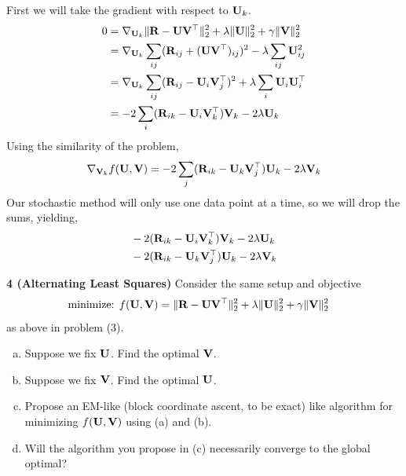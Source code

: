 \documentclass[12pt,letterpaper,fleqn]{hmcpset}
\begin{document}
\begin{solution}
    First we will take the gradient with respect to ${\bf U}_k$.
    \begin{align*}
        0 &= \nabla_{{\bf U}_k} \|{\bf R} - {\bf U}{\bf V}^\top\|_2^2 + \lambda\|{\bf U}\|_2^2 + \gamma\|{\bf V}\|_2^2\\
        &= \nabla_{{\bf U}_k} \sum_{ij}({\bf R}_{ij} + ({\bf U} {\bf V}^\top)_{ij} )^2 - \lambda \sum_{ij} {\bf U}_{ij}^2 \\
        &= \nabla_{{\bf U}_k} \sum_{ij}({\bf R}_{ij} - {\bf U}_i {\bf V}^\top_j )^2 + \lambda \sum_{i} {\bf U}_i {\bf U}_i^\top \\
        &=  -2 \sum_{i}({\bf R}_{ik} - {\bf U}_i {\bf V}^\top_k) {\bf V}_k - 2\lambda {\bf U}_{k}
    \end{align*}
    Using the similarity of the problem, 
    $$
        \nabla_{{\bf V}_k} f({\bf U},{\bf V}) = -2 \sum_{j}({\bf R}_{ik} - {\bf U}_k {\bf V}^\top_j) {\bf U}_k - 2\lambda {\bf V}_{k}
    $$
    Our stochastic method will only use one data point at a time, so we will drop the sums, yielding,
    \begin{align*}
        & -2 ({\bf R}_{ik} - {\bf U}_i {\bf V}^\top_k) {\bf V}_k - 2\lambda {\bf U}_{k} \\
        &  -2 ({\bf R}_{ik} - {\bf U}_k {\bf V}^\top_j) {\bf U}_k - 2\lambda {\bf V}_{k}
    \end{align*}
\end{solution}

\newpage

\textbf{4 (Alternating Least Squares)} Consider the same setup and objective
\begin{align*}
    \text{minimize: } & f({\bf U},{\bf V}) = \|{\bf R} - {\bf U}{\bf V}^\top\|_2^2 + \lambda\|{\bf U}\|_2^2 + \gamma\|{\bf V}\|_2^2
\end{align*}
as above in problem (3).
\begin{enumerate}[(a)]
    \item Suppose we fix ${\bf U}$. Find the optimal ${\bf V}$.
    \item Suppose we fix ${\bf V}$. Find the optimal ${\bf U}$.
    \item Propose an EM-like (block coordinate ascent, to be exact) like algorithm
        for minimizing $f({\bf U},{\bf V})$ using (a) and (b).
    \item Will the algorithm you propose in (c) necessarily converge to the global
        optimal?
\end{enumerate}
\end{document}
